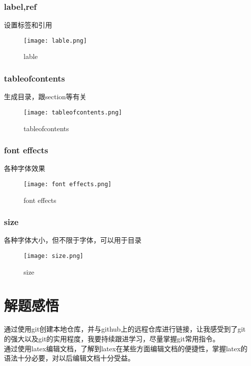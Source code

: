 \documentclass{ctexart}
\begin{document}
\subsubsection{label,ref}
设置标签和引用\\
\begin{figure}[h]
    \centering
    \texttt{[image: lable.png]}
    \caption{lable}
    \label{fig:enter-label}
\end{figure}

\subsubsection{tableofcontents}
生成目录，跟section等有关\\
\begin{figure}[h]
    \centering
    \texttt{[image: tableofcontents.png]}
    \caption{tableofcontents}
    \label{fig:enter-label}
\end{figure}

\subsubsection{font effects}
各种字体效果\\
\begin{figure}[h]
    \centering
    \texttt{[image: font effects.png]}
    \caption{font effects}
    \label{fig:enter-label}
\end{figure}

\subsubsection{size}
各种字体大小，但不限于字体，可以用于目录\\
\begin{figure}[h]
    \centering
    \texttt{[image: size.png]}
    \caption{size}
    \label{fig:enter-label}
\end{figure}

\section{解题感悟}
通过使用git创建本地仓库，并与github上的远程仓库进行链接，让我感受到了git的强大以及git的实用程度，我要持续跟进学习，尽量掌握git常用指令。\\ 
通过使用latex编辑文档，了解到latex在某些方面编辑文档的便捷性，掌握latex的语法十分必要，对以后编辑文档十分受益。
\end{document}
